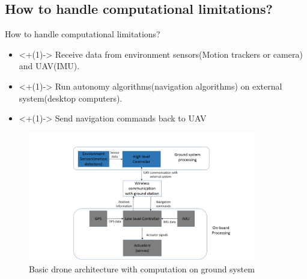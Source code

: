 \documentclass[8pt]{beamer}
\begin{document}
\subsection{How to handle computational limitations?}
\begin{frame}{How to handle computational limitations?}
\begin{itemize}[<+(1)->]
 \setlength\itemsep{1em}
     \item<+(1)-> {Receive data from environment sensors(Motion trackers or camera) and UAV(IMU).}
     \item<+(1)-> {Run autonomy algorithms(navigation algorithms) on external system(desktop computers).}
     \item<+(1)-> {Send navigation commands back to UAV}
    \end{itemize}
 \begin{figure}[h]
  \centering
\includegraphics[width=10cm]{images/basic_acrh2.PNG}%
\caption{Basic drone architecture with computation on ground system}%
  \label{fig:drone_ground_communication}
\end{figure}
  
\end{frame}
\end{document}
